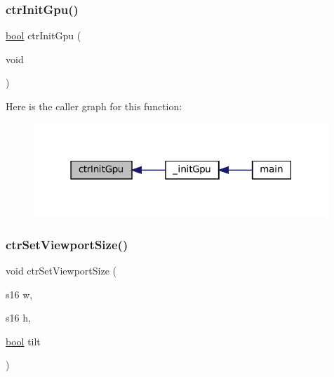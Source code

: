 \subsubsection{\texorpdfstring{ctr\+Init\+Gpu()}{ctrInitGpu()}}
{\footnotesize\ttfamily \mbox{\hyperlink{libretro_8h_a4a26dcae73fb7e1528214a068aca317e}{bool}} ctr\+Init\+Gpu (\begin{DoxyParamCaption}\item[{void}]{ }\end{DoxyParamCaption})}

Here is the caller graph for this function\+:
\nopagebreak
\begin{figure}[H]
\begin{center}
\leavevmode
\includegraphics[width=315pt]{ctr-gpu_8c_a04a94149209a778c397be256b872da4a_icgraph}
\end{center}
\end{figure}
\mbox{\label{ctr-gpu_8c_a10edf7402a10780992aef77c359f99b4}} 
\subsubsection{\texorpdfstring{ctr\+Set\+Viewport\+Size()}{ctrSetViewportSize()}}
{\footnotesize\ttfamily void ctr\+Set\+Viewport\+Size (\begin{DoxyParamCaption}\item[{s16}]{w,  }\item[{s16}]{h,  }\item[{\mbox{\hyperlink{libretro_8h_a4a26dcae73fb7e1528214a068aca317e}{bool}}}]{tilt }\end{DoxyParamCaption})}

